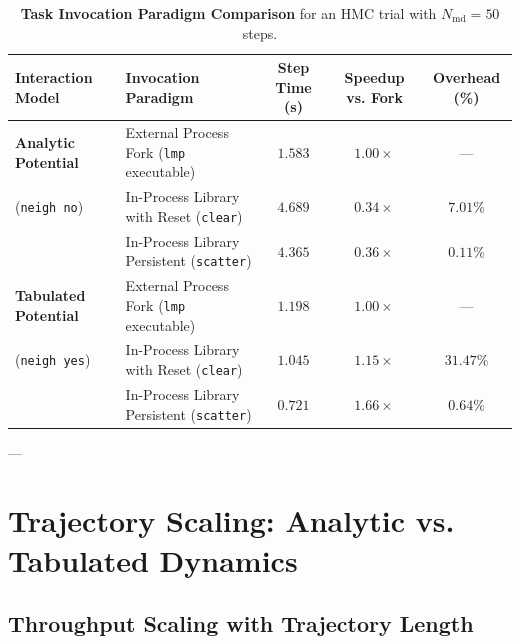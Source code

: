 \documentclass[11pt,a4paper]{article}
\begin{document}
\begin{table}[t]
\centering
\small
\caption{\textbf{Task Invocation Paradigm Comparison} for an HMC trial with $N_{\mathrm{md}} = 50$ steps.}
\label{tab:fork_vs_lib}
\begin{tabularx}{\textwidth}{lXccc}
\toprule
\textbf{Interaction Model} & \textbf{Invocation Paradigm} & \textbf{Step Time (s)} & \textbf{Speedup vs. Fork} & \textbf{Overhead (\%)} \\
\midrule
\textbf{Analytic Potential}  & External Process Fork (\texttt{lmp} executable) & $1.583$ & $1.00\times$ & --- \\
(\texttt{neigh no})          & In-Process Library with Reset (\texttt{clear})   & $4.689$ & $0.34\times$ & $7.01\%$ \\
                             & In-Process Library Persistent (\texttt{scatter})& $4.365$ & $0.36\times$ & $\mathbf{0.11\%}$ \\
\midrule
\textbf{Tabulated Potential} & External Process Fork (\texttt{lmp} executable) & $1.198$ & $1.00\times$ & --- \\
(\texttt{neigh yes})         & In-Process Library with Reset (\texttt{clear})   & $1.045$ & $1.15\times$ & $31.47\%$ \\
                             & In-Process Library Persistent (\texttt{scatter})& $\mathbf{0.721}$ & $\mathbf{1.66\times}$ & $\mathbf{0.64\%}$ \\
\bottomrule
\end{tabularx}
\end{table}

---

\section{Trajectory Scaling: Analytic vs. Tabulated Dynamics}

\subsection{Throughput Scaling with Trajectory Length}
\end{document}

